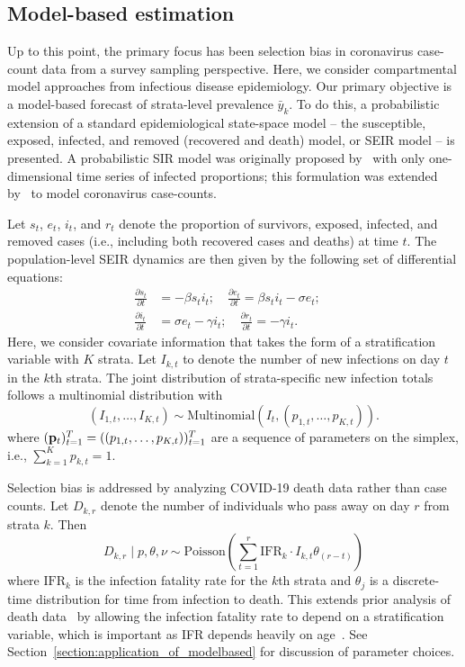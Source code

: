 \documentclass[11pt]{amsart}
\numberwithin{equation}{section}
\theoremstyle{plain}
\begin{document}
 \subsection{Model-based estimation}
 \label{section:modelbased}

 Up to this point, the primary focus has been selection bias in coronavirus case-count data from a survey sampling perspective.  Here, we consider compartmental model approaches from infectious disease epidemiology.  Our primary objective is a model-based forecast of strata-level prevalence $\bar y_k$. To do this, a probabilistic extension of a standard epidemiological state-space model -- the susceptible, exposed, infected, and removed (recovered and death) model, or SEIR model -- is presented. A probabilistic SIR model was originally proposed by~\cite{Osthus2017} with only one-dimensional time series of infected proportions; this formulation was extended by~\cite{Song2020} to model coronavirus case-counts.

 Let $s_t$, $e_t$, $i_t$, and $r_t$ denote the proportion of survivors, exposed, infected, and removed cases (i.e., including both recovered cases and deaths) at time $t$.  The population-level SEIR dynamics are then given by the following set of differential equations:
\begin{align}
 \frac{\partial s_t}{\partial t} &= - \beta s_t i_t; \quad \frac{\partial e_t}{\partial t} = \beta s_t i_t - \sigma e_t; \quad \label{eq:seir} \\
 \frac{\partial i_t}{\partial t} &= \sigma e_t - \gamma i_t; \quad
 \frac{\partial r_t}{\partial t} = - \gamma i_t. \nonumber
\end{align}
Here, we consider covariate information that takes the form of a stratification variable with $K$ strata.  Let $I_{k,t}$ to denote the number of new infections on day $t$ in the $k$th strata.  The joint distribution of strata-specific new infection totals follows a multinomial distribution with
 $$
 ( I_{1,t}, \ldots, I_{K,t} ) \sim \text{Multinomial} \left( I_t, (p_{1,t}, \ldots, p_{K, t}) \right).
 $$
 where $( {\bf p}_t )_{t=1}^T = ( (p_{1,t}, \ldots, p_{K, t}) )_{t=1}^T$ are a sequence of parameters on the simplex, i.e., $\sum_{k=1}^K p_{k,t} = 1$.

 Selection bias is addressed by analyzing COVID-19 death data rather than case counts.  Let $D_{k,r}$ denote the number of individuals who pass away on day $r$ from strata $k$.  Then
 $$
 D_{k,r} \mid p, \theta, \nu \sim \text{Poisson} \left( \sum_{t=1}^r \text{IFR}_{k} \cdot I_{k,t} \theta_{(r-t)} \right)
 $$
 where $\text{IFR}_{k}$ is the infection fatality rate for the $k$th strata and $\theta_{j}$ is a discrete-time distribution for time from infection to death.  This extends prior analysis of death data~\cite{Johndrow2020} by allowing the infection fatality rate to depend on a stratification variable, which is important as IFR depends heavily on age~\citep{Levin2020}. See Section~\ref{section:application_of_modelbased} for discussion of parameter choices.  %
\end{document}
